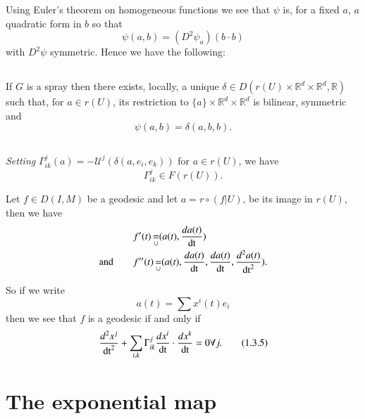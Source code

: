 Using Euler's theorem on homogeneous functions we see that $\psi$ is,
for a fixed $a$, $a$ quadratic form in $b$ so that
\begin{equation*}
\psi(a,b)=(D^{2}\psi_{a})(b\cdot b)\tag{1.3.2}\label{chap1:1.3.2}
\end{equation*}
with $D^{2}\psi$ symmetric. Hence we have the following:


\setcounter{subsection}{2}
\subsection{}\label{chap1:1.3.3}


\begin{prop*}
If $G$ is a spray then there exists, locally, a unique $\delta \in
D(r(U)\times\mathbb{R}^{d}\times \mathbb{R}^{d},\mathbb{R})$ such
that, for $a\in r(U)$, its restriction to $\{a\}\times
\mathbb{R}^{d}\times \mathbb{R}^{d}$ is bilinear, symmetric and
$$
\psi(a,b)=\delta(a,b,b).
$$
\end{prop*}

\setcounter{subsection}{3}
\subsection{}\label{chap1:1.3.4}

{\em Setting}
$\Gamma^{j}_{ik}(a)=-\mathscr{U}^{j}(\delta(a,e_{i},e_{k}))$ for $a\in
r(U)$, we have
$$
\Gamma^{j}_{ik}\in F(r(U)).
$$

Let $f\in D(I,M)$ be a geodesic and let $a=r\circ (f|U)$, be its image
in $r(U)$, then we have
\begin{align*}
& f'(t)\mathop{=}_{\cup}(a(t),\frac{da(t)}{\operatorname{dt}})\\
\text{and}\qquad & f''(t)\mathop{=}_{\cup}(a(t),\frac{da(t)}{\operatorname{dt}}, \frac{da(t)}{\operatorname{dt}},\frac{d^{2}a(t)}{\operatorname{dt}^{2}}).
\end{align*}

So if we write
$$
a(t)=\sum x^{i}(t)e_{i}
$$
then we see that $f$ is a geodesic if and only if 
\begin{equation*}
\frac{d^{2}x^{j}}{\operatorname{dt}^{2}}+\sum_{i,k}\Gamma^{j}_{ik}\frac{dx^{i}}{\operatorname{dt}}\cdot
\frac{dx^{k}}{\operatorname{dt}}=0\forall j.\tag{1.3.5}\label{chap1:1.3.5}
\end{equation*}\pageoriginale

\section{The exponential map}\label{chap1:sec4}

